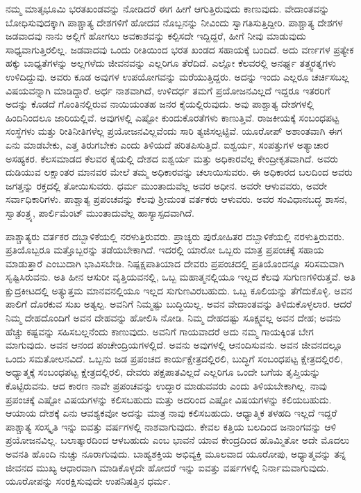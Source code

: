 \vskip 0.3cm

ನಮ್ಮ ಮಾತೃಭೂಮಿ ಭರತಖಂಡವನ್ನು ನೋಡಿದರೆ ಈಗ ಹೀಗೆ ಆಗುತ್ತಿರುವುದು ಕಾಣುವುದು. ವೇದಾಂತವನ್ನು ಬೋಧಿಸುವುದಕ್ಕಾಗಿ ಪಾಶ್ಚಾತ್ಯ ದೇಶಗಳಿಗೆ ಹೋದವ\- ನೊಬ್ಬನನ್ನು ನೀವಿಂದು ಸ್ವಾಗತಿಸುತ್ತಿದ್ದೀರಿ. ಪಾಶ್ಚಾತ್ಯ ದೇಶಗಳ ಜಡವಾದವು ನಾನು ಅಲ್ಲಿಗೆ ಹೋಗಲು ಅವಕಾಶವನ್ನು ಕಲ್ಪಿಸದೇ ಇದ್ದಿದ್ದರೆ, ಹೀಗೆ ನೀವು ಮಾಡುವುದು ಸಾಧ್ಯವಾಗುತ್ತಿರಲಿಲ್ಲ. ಜಡವಾದವು ಒಂದು ರೀತಿಯಿಂದ ಭರತ ಖಂಡದ ಸಹಾಯಕ್ಕೆ ಬಂದಿದೆ. ಅದು ವರ್ಣಗಳ ಪ್ರತ್ಯೇಕ ಹಕ್ಕು ಬಾಧ್ಯತೆಗಳನ್ನು ಅಲ್ಲಗಳೆದು ಜೀವನವನ್ನು ಎಲ್ಲರಿಗೂ ತೆರೆದಿದೆ. ಎಲ್ಲೋ ಕೆಲವರಲ್ಲಿ ಅನರ್ಘ್ಯ ತತ್ತ್ವರತ್ನಗಳು ಉಳಿದಿದ್ದುವು. ಅವರು ಕೂಡ ಅವುಗಳ ಉಪಯೋಗವನ್ನು ಮರೆಯುತ್ತಿದ್ದರು. ಅದನ್ನು ಇಂದು ಎಲ್ಲರೂ ಚರ್ಚಿಸಬಲ್ಲ ವಿಷಯವನ್ನಾಗಿ ಮಾಡಿದ್ದಾರೆ. ಅರ್ಧ ನಾಶವಾಗಿದೆ, ಉಳಿದರ್ಧ ತಮಗೆ ಪ್ರಯೋಜನವಿಲ್ಲದೆ ಇದ್ದರೂ ಇತರರಿಗೆ ಅದನ್ನು ಕೊಡದೆ ಗೊಂತಿನಲ್ಲಿರುವ ನಾಯಿಯಂತಹ ಜನರ ಕೈಯಲ್ಲಿರುವುದು. ಅವು ಪಾಶ್ಚಾತ್ಯ ದೇಶಗಳಲ್ಲಿ ಹಿಂದಿನಿಂದಲೂ ಜಾರಿಯಲ್ಲಿವೆ. ಅವುಗಳಲ್ಲಿ ಎಷ್ಟೋ ಕುಂದುಕೊರತೆಗಳು ಕಾಣುತ್ತಿವೆ. ರಾಜಕೀಯಕ್ಕೆ ಸಂಬಂಧಪಟ್ಟ ಸಂಸ್ಥೆಗಳು ಮತ್ತು ರೀತಿನೀತಿಗಳೆಲ್ಲ ಪ್ರಯೋಜನವಿಲ್ಲವೆಂದು ಸಾರಿ ತ್ಯಜಿಸಲ್ಪಟ್ಟಿವೆ. ಯೂರೋಪ್​ ಅಶಾಂತವಾಗಿ ಈಗ ಏನು ಮಾಡಬೇಕು, ಎತ್ತ ತಿರುಗಬೇಕು ಎಂದು ತಿಳಿಯದೆ ಪರಿತಪಿಸುತ್ತಿದೆ. ಐಶ್ವರ್ಯ, ಸಂಪತ್ತುಗಳ ಅತ್ಯಾಚಾರ ಅಸಹ್ಯಕರ. ಕೆಲಸಮಾಡದ ಕೆಲವರ ಕೈಯಲ್ಲಿ ದೇಶದ ಐಶ್ವರ್ಯ ಮತ್ತು ಅಧಿಕಾರವೆಲ್ಲ ಕೇಂದ್ರೀಕೃತವಾಗಿದೆ. ಅವರು ದುಡಿಯುವ ಲಕ್ಷಾಂತರ ಮಾನವರ ಮೇಲೆ ತಮ್ಮ ಅಧಿಕಾರವನ್ನು ಚಲಾಯಿಸುವರು. ಈ ಅಧಿಕಾರದ ಬಲದಿಂದ ಅವರು ಜಗತ್ತನ್ನು ರಕ್ತದಲ್ಲಿ ತೋಯಿಸುವರು. ಧರ್ಮ ಮುಂತಾದುವೆಲ್ಲ ಅವರ ಅಧೀನ. ಅವರೇ ಆಳುವವರು, ಅವರೇ ಸರ್ವಾಧಿಕಾರಿಗಳು. ಪಾಶ್ಚಾತ್ಯ ಪ್ರಪಂಚವನ್ನು ಕೆಲವು ಶ‍್ರೀಮಂತ ವರ್ತಕರು ಆಳುವರು. ಅವರ ಸಂವಿಧಾನಬದ್ಧ ಶಾಸನ, ಸ್ವಾತಂತ್ರ್ಯ, ಪಾರ್ಲಿಮೆಂಟ್​ ಮುಂತಾದುವೆಲ್ಲ ಹಾಸ್ಯಾಸ್ಪದವಾಗಿದೆ.

ಪಾಶ್ಚಾತ್ಯರು ವರ್ತಕರ ದಬ್ಬಾಳಿಕೆಯಲ್ಲಿ ನರಳುತ್ತಿರುವರು. ಪ್ರಾಚ್ಯರು ಪುರೋಹಿತರ ದಬ್ಬಾಳಿಕೆಯಲ್ಲಿ ನರಳುತ್ತಿರುವರು. ಪ್ರತಿಯೊಬ್ಬರೂ ಮತ್ತೊಬ್ಬರನ್ನು ತಡೆಯಬೇಕಾಗಿದೆ. ಇದರಲ್ಲಿ ಯಾರೋ ಒಬ್ಬರು ಮಾತ್ರ ಪ್ರಪಂಚಕ್ಕೆ ಸಹಾಯ ಮಾಡುತ್ತಾರೆ ಎಂಬುದಾಗಿ ಭಾವಿಸಬೇಡಿ. ನಿಷ್ಪಕ್ಷಪಾತಿಯಾದ ದೇವರು ಪ್ರಪಂಚದಲ್ಲಿ ಪ್ರತಿಯೊಂದನ್ನೂ ಸರಿಸಮವಾಗಿ ಸೃಷ್ಟಿಸಿರುವನು. ಅತಿ ಹೀನ ಆಸುರೀ ವೃತ್ತಿಯವನಲ್ಲಿ, ಒಬ್ಬ ಮಹಾತ್ಮ\-ನಲ್ಲಿಯೂ ಇಲ್ಲದ ಕೆಲವು ಸುಗುಣಗಳಿರುತ್ತವೆ. ಅತಿ ಕ್ಷುದ್ರಕೀಟದಲ್ಲಿ ಅತ್ಯುತ್ತಮ ಮಾನವನಲ್ಲಿಯೂ ಇಲ್ಲದ ಸುಗುಣವಿರಬಹುದು. ಒಬ್ಬ ಕೂಲಿಯನ್ನು ತೆಗೆದುಕೊಳ್ಳಿ. ಅವನ ಪಾಲಿಗೆ ದೊರಕುವ ಸುಖ ಅತ್ಯಲ್ಪ. ಅವನಿಗೆ ನಿಮ್ಮಷ್ಟು ಬುದ್ಧಿಯಿಲ್ಲ. ಅವನ ವೇದಾಂತವನ್ನು ತಿಳಿದುಕೊಳ್ಳಲಾರ. ಆದರೆ ನಿಮ್ಮ ದೇಹದೊಂದಿಗೆ ಅವನ ದೇಹವನ್ನು ಹೋಲಿಸಿ ನೋಡಿ. ನಿಮ್ಮ ದೇಹದಷ್ಟು ಸೂಕ್ಷ್ಮವಲ್ಲ ಅವನ ದೇಹ; ಅವನು ಹೆಚ್ಚು ಕಷ್ಟವನ್ನು ಸಹಿಸಬಲ್ಲನೆಂದು ಕಾಣುವುದು. ಅವನಿಗೆ ಗಾಯವಾದರೆ ಅದು ನಮ್ಮ ಗಾಯಕ್ಕಿಂತ ಬೇಗ ಮಾಗುವುದು. ಅವನ ಆನಂದ ಪಂಚೇಂದ್ರಿಯಗಳಲ್ಲಿದೆ. ಅವನು ಅವುಗಳಲ್ಲಿ ಆನಂದಿಸುವನು. ಅವನ ಜೀವನದಲ್ಲೂ ಒಂದು ಸಮತೋಲನವಿದೆ. ಒಬ್ಬನು ಜಡ ಪ್ರಪಂಚದ ಕಾರ್ಯಕ್ಷೇತ್ರದಲ್ಲಿರಲಿ, ಬುದ್ಧಿಗೆ ಸಂಬಂಧಪಟ್ಟ ಕ್ಷೇತ್ರದಲ್ಲಿರಲಿ, ಅಧ್ಯಾತ್ಮಕ್ಕೆ ಸಂಬಂಧಪಟ್ಟ ಕ್ಷೇತ್ರದಲ್ಲಿರಲಿ, ದೇವರು ಪಕ್ಷಪಾತವಿಲ್ಲದೆ ಎಲ್ಲರಿಗೂ ಒಂದೇ ಬಗೆಯ ತೃಪ್ತಿಯನ್ನು ಕೊಟ್ಟಿರುವನು. ಆದ ಕಾರಣ ನಾವೇ ಪ್ರಪಂಚವನ್ನು ಉದ್ಧಾರ ಮಾಡುವವರು ಎಂದು ತಿಳಿಯಬೇಕಾಗಿಲ್ಲ. ನಾವು ಪ್ರಪಂಚಕ್ಕೆ ಎಷ್ಟೋ ವಿಷಯಗಳನ್ನು ಕಲಿಸಬಹುದು ಮತ್ತು ಅದರಿಂದ ಎಷ್ಟೋ ವಿಷಯಗಳನ್ನು ಕಲಿಯಬಹುದು. ಆಯಾಯ ದೇಶಕ್ಕೆ ಏನು ಆವಶ್ಯಕವೋ ಅದನ್ನು ಮಾತ್ರ ನಾವು ಕಲಿಸಬಹುದು. ಆಧ್ಯಾತ್ಮಿಕ ತಳಹದಿ ಇಲ್ಲದೆ ಇದ್ದರೆ ಪಾಶ್ಚಾತ್ಯ ಸಂಸ್ಕೃತಿ ಇನ್ನು ಐವತ್ತು ವರ್ಷಗಳಲ್ಲಿ ನಾಶವಾಗುವುದು. ಕೇವಲ ಕತ್ತಿಯ ಬಲದಿಂದ ಜನಾಂಗವನ್ನು ಆಳಿ ಪ್ರಯೋಜನವಿಲ್ಲ. ಬಲಾತ್ಕಾರದಿಂದ ಆಳಬಹುದು ಎಂಬ ಭಾವನೆ ಯಾವ ಕೇಂದ್ರದಿಂದ ಹೊಮ್ಮಿತೋ ಅದೇ ಮೊದಲು ಅವನತಿ ಹೊಂದಿ ನುಚ್ಚು ನೂರಾಗುವುದು. ಬಾಹ್ಯಶಕ್ತಿಯ ಅಭಿವ್ಯಕ್ತಿ ಮೂಲವಾದ ಯೂರೋಪು, ಅಧ್ಯಾತ್ಮವನ್ನು ತನ್ನ ಜೀವನದ ಮುಖ್ಯ ಆಧಾರವಾಗಿ ಮಾಡಿಕೊಳ್ಳದೇ ಹೋದರೆ ಇನ್ನು ಐವತ್ತು ವರ್ಷಗಳಲ್ಲಿ ನಿರ್ನಾಮವಾಗುವುದು. ಯೂರೋಪನ್ನು ಸಂರಕ್ಷಿಸುವುದೇ ಉಪನಿಷತ್ತಿನ ಧರ್ಮ.


